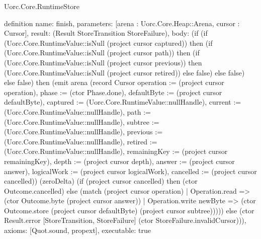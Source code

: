 \begin{lexlean}{Uorc.Core.RuntimeStore}
\begin{semanticmodule}
definition{
  name: finish,
  parameters: [arena : Uorc.Core.Heap::Arena, cursor : Cursor],
  result: (Result StoreTransition StoreFailure),
  body: (if (if (Uorc.Core.RuntimeValue::isNull (project cursor captured)) then (if (Uorc.Core.RuntimeValue::isNull (project cursor path)) then (if (Uorc.Core.RuntimeValue::isNull (project cursor previous)) then (Uorc.Core.RuntimeValue::isNull (project cursor retired)) else false) else false) else false) then (emit arena (record Cursor {operation := (project cursor operation), phase := (ctor Phase.done), defaultByte := (project cursor defaultByte), captured := (Uorc.Core.RuntimeValue::nullHandle), current := (Uorc.Core.RuntimeValue::nullHandle), path := (Uorc.Core.RuntimeValue::nullHandle), subtree := (Uorc.Core.RuntimeValue::nullHandle), previous := (Uorc.Core.RuntimeValue::nullHandle), retired := (Uorc.Core.RuntimeValue::nullHandle), remainingKey := (project cursor remainingKey), depth := (project cursor depth), answer := (project cursor answer), logicalWork := (project cursor logicalWork), cancelled := (project cursor cancelled)}) (zeroDelta) (if (project cursor cancelled) then (ctor Outcome.cancelled) else (match (project cursor operation)
    | Operation.read => (ctor Outcome.byte (project cursor answer))
    | Operation.write newByte => (ctor Outcome.store (project cursor defaultByte) (project cursor subtree))))) else (ctor Result.error [StoreTransition, StoreFailure] (ctor StoreFailure.invalidCursor))),
  axioms: [Quot.sound, propext],
  executable: true
}


\end{semanticmodule}
\end{lexlean}

